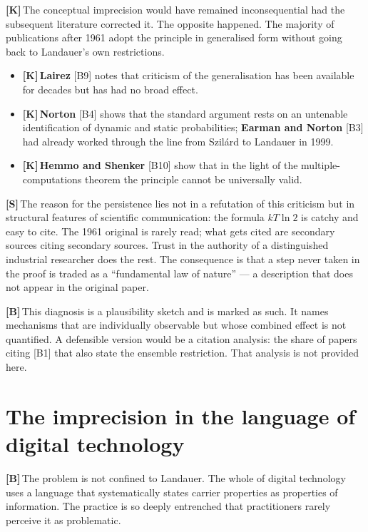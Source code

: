 \documentclass[11pt,a4paper]{article}
\newcommand{\LK}{\textcolor{layK}{\textbf{\footnotesize\textsf{[K]}}}\,}
\newcommand{\LB}{\textcolor{layB}{\textbf{\footnotesize\textsf{[B]}}}\,}
\newcommand{\LSk}{\textcolor{layS}{\textbf{\footnotesize\textsf{[S]}}}\,}
\theoremstyle{ffgft}
\begin{document}
\LK The conceptual imprecision would have remained inconsequential had the
subsequent literature corrected it. The opposite happened. The majority of
publications after 1961 adopt the principle in generalised form without going back
to Landauer's own restrictions.

\begin{itemize}[leftmargin=1.4em,itemsep=0.3em]
  \item \LK \textbf{Lairez} [B9] notes that criticism of the generalisation has
        been available for decades but has had no broad effect.
  \item \LK \textbf{Norton} [B4] shows that the standard argument rests on an
        untenable identification of dynamic and static probabilities;
        \textbf{Earman and Norton} [B3] had already worked through the line from
        Szilárd to Landauer in 1999.
  \item \LK \textbf{Hemmo and Shenker} [B10] show that in the light of the
        multiple-computations theorem the principle cannot be universally valid.
\end{itemize}

\LSk The reason for the persistence lies not in a refutation of this criticism but
in structural features of scientific communication: the formula $kT\ln 2$ is
catchy and easy to cite. The 1961 original is rarely read; what gets cited are
secondary sources citing secondary sources. Trust in the authority of a
distinguished industrial researcher does the rest. The consequence is that a step
never taken in the proof is traded as a “fundamental law of nature” --- a
description that does not appear in the original paper.

\LB This diagnosis is a plausibility sketch and is marked as such. It names
mechanisms that are individually observable but whose combined effect is not
quantified. A defensible version would be a citation analysis: the share of papers
citing [B1] that also state the ensemble restriction. That analysis is not
provided here.

\section{The imprecision in the language of digital technology}

\LB The problem is not confined to Landauer. The whole of digital technology uses a
language that systematically states carrier properties as properties of
information. The practice is so deeply entrenched that practitioners rarely
perceive it as problematic.
\end{document}
